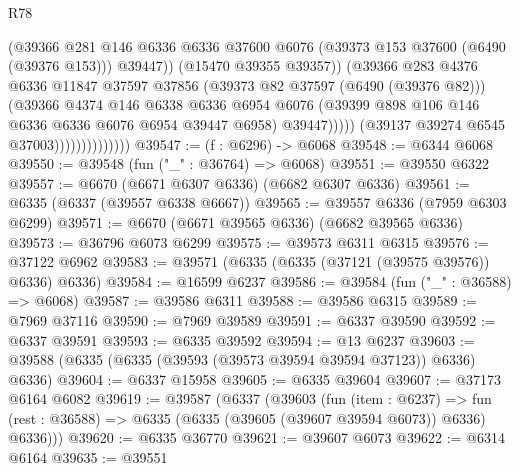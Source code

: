 \begin{lexlean}{R78}
\begin{coremodule}
                                        (@39366
                                          @281
                                          @146
                                          @6336
                                          @6336
                                          @37600
                                          @6076
                                          (@39373 @153 @37600 (@6490 (@39376 @153)))
                                          @39447))
                                      (@15470 @39355 @39357))
                                    (@39366
                                      @283
                                      @4376
                                      @6336
                                      @11847
                                      @37597
                                      @37856
                                      (@39373 @82 @37597 (@6490 (@39376 @82)))
                                      (@39366
                                        @4374
                                        @146
                                        @6338
                                        @6336
                                        @6954
                                        @6076
                                        (@39399 @898 @106 @146 @6336 @6336 @6076 @6954 @39447 @6958)
                                        @39447)))))
                              (@39137 @39274 @6545 @37003))))))))))))))
@39547 := (f : @6296) -> @6068
@39548 := @6344 @6068
@39550 := @39548 (fun ("_" : @36764) => @6068)
@39551 := @39550 @6322
@39557 := @6670 (@6671 @6307 @6336) (@6682 @6307 @6336)
@39561 := @6335 (@6337 (@39557 @6338 @6667))
@39565 := @39557 @6336 (@7959 @6303 @6299)
@39571 := @6670 (@6671 @39565 @6336) (@6682 @39565 @6336)
@39573 := @36796 @6073 @6299
@39575 := @39573 @6311 @6315
@39576 := @37122 @6962
@39583 := @39571 (@6335 (@6335 (@37121 (@39575 @39576)) @6336) @6336)
@39584 := @16599 @6237
@39586 := @39584 (fun ("_" : @36588) => @6068)
@39587 := @39586 @6311
@39588 := @39586 @6315
@39589 := @7969 @37116
@39590 := @7969 @39589
@39591 := @6337 @39590
@39592 := @6337 @39591
@39593 := @6335 @39592
@39594 := @13 @6237
@39603 := @39588 (@6335 (@6335 (@39593 (@39573 @39594 @39594 @37123)) @6336) @6336)
@39604 := @6337 @15958
@39605 := @6335 @39604
@39607 := @37173 @6164 @6082
@39619 := @39587
    (@6337
      (@39603
        (fun (item : @6237) =>
        fun (rest : @36588) => @6335 (@6335 (@39605 (@39607 @39594 @6073)) @6336) @6336)))
@39620 := @6335 @36770
@39621 := @39607 @6073
@39622 := @6314 @6164
@39635 := @39551

\end{coremodule}
\end{lexlean}
